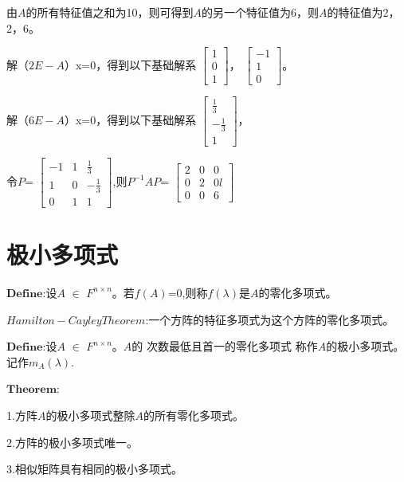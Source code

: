 \documentclass[lang=cn,10pt]{elegantbook}
\begin{document}
由$\mathit{A}$的所有特征值之和为10，则可得到$\mathit{A}$的另一个特征值为6，则$\mathit{A}$的特征值为2，2，6。

解（$\mathit{2E-A}$）x=0，得到以下基础解系
$\begin{bmatrix}
	1\\
	0\\
	1
\end{bmatrix}$，
$\begin{bmatrix}
	-1\\
	1\\
	0
\end{bmatrix}$。

解（$\mathit{6E-A}$）x=0，得到以下基础解系
$\begin{bmatrix}
	\frac{1}{3}\\
	-\frac{1}{3}\\
	1
\end{bmatrix}$，

令$\mathit{P}$=
$\begin{bmatrix}
	-1& 1 & \frac{1}{3}\\
	1& 0 & -\frac{1}{3}\\
	0&1  &1
\end{bmatrix}$,则$\mathit{P^{-1}AP}$=
$\begin{bmatrix}
	2& 0 & 0\\
	0& 2 & 0l  \\
	0&0  &6
\end{bmatrix}$
~\\

\section{极小多项式}

$\mathbf{Define}$:设$\mathit{A}$ $\in$ $\mathit{F^{n\times n} }$。若$\mathit{f(A)}$=0,则称$\mathit{f(\lambda)}$是$\mathit{A}$的零化多项式。

$\mathit{Hamilton-CayleyTheorem}$:一个方阵的特征多项式为这个方阵的零化多项式。

$\mathbf{Define}$:设$\mathit{A}$ $\in$ $\mathit{F^{n\times n} }$。$\mathit{A}$的
{\color{red}次数最低且首一的零化多项式 }称作$\mathit{A}$的极小多项式。记作$m_{\mathit{A}}(\lambda).$

$\mathbf{Theorem}$:

1.方阵$\mathit{A}$的极小多项式整除$\mathit{A}$的所有零化多项式。

2.方阵的极小多项式唯一。

3.相似矩阵具有相同的极小多项式。
\end{document}
